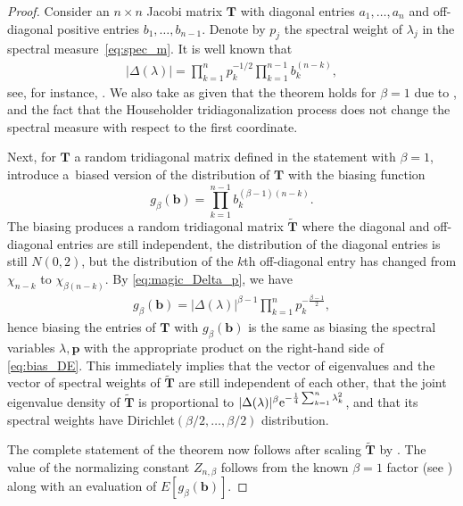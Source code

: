 \documentclass[pdftex]{sigma}
\numberwithin{equation}{section}
\theoremstyle{definition}
\newcommand{\mbf}[1]{\mathbf{#1}}
\newcommand{\wt}[1]{\widetilde{#1}}
\begin{document}
\begin{proof}
Consider an $n\times n$ Jacobi matrix $\mbf{T}$
with diagonal entries $a_1,\dots, a_n$ and off-diagonal positive entries $b_1, \dots, b_{n-1}$. Denote by $p_j$ the spectral weight of $\lambda_j$ in the spectral measure~\eqref{eq:spec_m}. It is well known that
\begin{align}\label{eq:magic_Delta_p}
|\Delta({\lambda})|= \prod_{k=1}^n p_k^{-1/2} \prod_{k=1}^{n-1} b_k^{(n-k)},
\end{align}
see, for instance, \cite[equation~(1.148)]{ForBook}.
We also take as given that the theorem holds for $\beta=1$ due to \cite{Trotter}, and the fact that the
Householder tridiagonalization process does not change the spectral measure with respect to the first coordinate.

Next, for $\mbf{T}$ a random tridiagonal matrix defined in the statement with $\beta=1$, introduce a~biased version of the distribution of $\mbf{T}$ with the biasing function
\[
g_\beta(\mbf{b})=\prod_{k=1}^{n-1} b_k^{(\beta-1)(n-k)}.
\]
The biasing produces a random tridiagonal matrix $\mbf{\wt{T}}$ where the diagonal and off-diagonal entries are still independent, the distribution of the diagonal entries is still $N(0,2)$, but the distribution of the $k$th off-diagonal entry has changed from $\chi_{n-k}$ to $\chi_{\beta(n-k)}$. By \eqref{eq:magic_Delta_p}, we have
\begin{align}\label{eq:bias_DE}
g_\beta(\mbf{b})=|\Delta({\lambda})|^{\beta-1} \prod_{k=1}^n p_k^{-\frac{\beta-1}{2}},
\end{align}
hence biasing the entries of $\mbf{T}$ with $g_\beta(\mbf{b})$ is the same as biasing the spectral variables $\lambda, \mbf{p}$ with the appropriate product on the right-hand side of \eqref{eq:bias_DE}. This immediately implies that the vector of eigenvalues and the vector of spectral weights of $\mbf{\wt{T}}$ are still independent of each other, that the joint eigenvalue density of $\mbf{\wt{T}}$ is proportional to $|\Delta(\lambda)|^\beta {\rm e}^{-\frac{1}{4}\sum_{k=1}^n \lambda_k^2}$, and that its spectral weights have Dirichlet$(\beta/2,\dots,\beta/2)$ distribution.

The complete statement of the theorem now follows after scaling $\mbf{\wt{T}}$ by . The value of the normalizing constant $Z_{n,\beta}$ follows from the known $\beta=1$ factor (see \cite[equation~(1.160)]{ForBook}) along with an evaluation of $E[g_\beta(\mbf{b})]$.
\end{proof}
\end{document}
